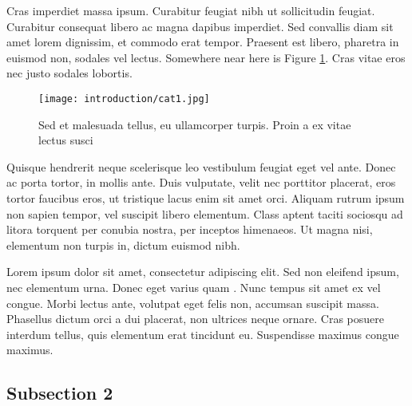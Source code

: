 Cras imperdiet massa ipsum. 
Curabitur feugiat nibh ut sollicitudin feugiat. 
Curabitur consequat libero ac magna dapibus imperdiet. 
Sed convallis diam sit amet lorem dignissim, et commodo erat tempor. 
Praesent est libero, pharetra in euismod non, sodales vel lectus.
Somewhere near here is Figure \ref{testfig2}. 
Cras vitae eros nec justo sodales lobortis.
\begin{figure}[t]
    \centering
    \texttt{[image: introduction/cat1.jpg]}
    \caption[This is another cat]{Sed et malesuada tellus, eu ullamcorper turpis. Proin a ex vitae lectus susci}
    \label{testfig2}
\end{figure} 
Quisque hendrerit neque scelerisque leo vestibulum feugiat eget vel ante. 
Donec ac porta tortor, in mollis ante. 
Duis vulputate, velit nec porttitor placerat, eros tortor faucibus eros, ut tristique lacus enim sit amet orci. 
Aliquam rutrum ipsum non sapien tempor, vel suscipit libero elementum. 
Class aptent taciti sociosqu ad litora torquent per conubia nostra, per inceptos himenaeos. 
Ut magna nisi, elementum non turpis in, dictum euismod nibh.

Lorem ipsum dolor sit amet, consectetur adipiscing elit. 
Sed non eleifend ipsum, nec elementum urna. 
Donec eget varius quam . Nunc tempus sit amet ex vel congue. 
Morbi lectus ante, volutpat eget felis non, accumsan suscipit massa. 
Phasellus dictum orci a dui placerat, non ultrices neque ornare. 
Cras posuere interdum tellus, quis elementum erat tincidunt eu. 
Suspendisse maximus congue maximus.

\subsection{Subsection 2}
\lipsum[5-8]